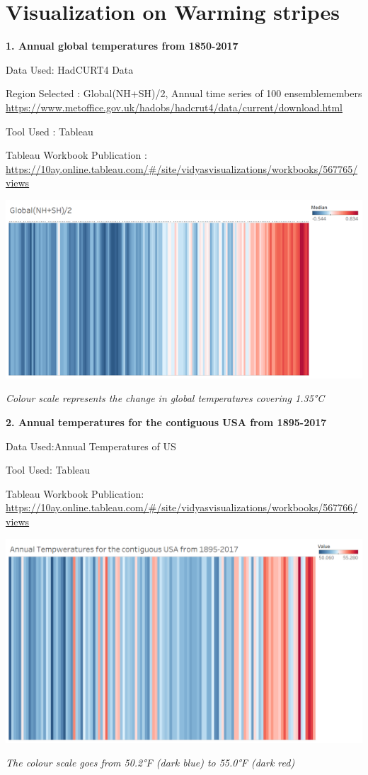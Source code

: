 \documentclass[]{book}
\begin{document}
\hypertarget{visualization-on-warming-stripes}{%
\chapter{Visualization on Warming stripes}\label{visualization-on-warming-stripes}}

\textbf{1. Annual global temperatures from 1850-2017}

Data Used: HadCURT4 Data

Region Selected : Global(NH+SH)/2, Annual time series of 100 ensemblemembers \url{https://www.metoffice.gov.uk/hadobs/hadcrut4/data/current/download.html}

Tool Used : Tableau

Tableau Workbook Publication : \url{https://10ay.online.tableau.com/\#/site/vidyasvisualizations/workbooks/567765/views}

\includegraphics{images/Global_WarmingStrips.png}

\emph{Colour scale represents the change in global temperatures covering 1.35°C}

\textbf{2. Annual temperatures for the contiguous USA from 1895-2017}

Data Used:Annual Temperatures of US \citep{NOAA}

Tool Used: Tableau

Tableau Workbook Publication: \url{https://10ay.online.tableau.com/\#/site/vidyasvisualizations/workbooks/567766/views}

\includegraphics{images/US_WarmingStrips.png}

\emph{The colour scale goes from 50.2°F (dark blue) to 55.0°F (dark red)}


\end{document}

